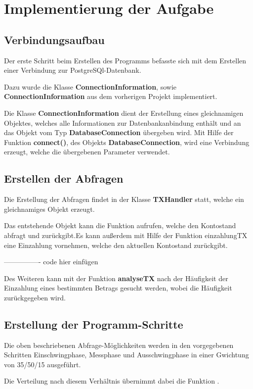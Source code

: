\section{Implementierung der Aufgabe}

\subsection{Verbindungsaufbau}
Der erste Schritt beim Erstellen des Programms befasste sich mit dem Erstellen
einer Verbindung zur PostgreSQl-Datenbank. 

Dazu wurde die Klasse \textbf{ConnectionInformation}, sowie
\textbf{ConnectionInformation} aus dem vorherigen Projekt implementiert. 

Die Klasse \textbf{ConnectionInformation} dient der Erstellung eines gleichnamigen
Objektes, welches alle Informationen zur Datenbankanbindung enthält und an das
Objekt vom Typ \textbf{DatabaseConnection} übergeben wird. Mit Hilfe der Funktion
\textbf{connect()}, des Objekts \textbf{DatabaseConnection}, wird eine Verbindung
erzeugt, welche die übergebenen Parameter verwendet.

\subsection{Erstellen der Abfragen}
Die Erstellung der Abfragen findet in der Klasse \textbf{TXHandler} statt, welche
ein gleichnamiges Objekt erzeugt. 

Das entstehende Objekt kann die Funktion  aufrufen, welche den
Kontostand abfragt und zurückgibt.Es kann außerdem mit Hilfe der Funktion
einzahlungTX eine Einzahlung vornehmen, welche den aktuellen Kontostand zurückgibt.


---------------- code hier einfügen

Des Weiteren kann mit der Funktion \textbf{analyseTX} nach der Häufigkeit der
Einzahlung eines bestimmten Betrags gesucht werden, wobei die Häufigkeit zurückgegeben wird.

\subsection{Erstellung der Programm-Schritte}
Die oben beschriebenen Abfrage-Möglichkeiten werden in den vorgegebenen
Schritten Einschwingphase, Messphase und Ausschwingphase in einer Gwichtung von
35/50/15 ausgeführt.

Die Verteilung nach diesem Verhältnis übernimmt dabei die Funktion
.


